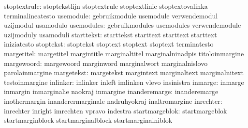                     stoptextrule: stoptekstlijn                    stoptextrule
                                  stoptextlinie                    stoptextovalinka
                                  terminalineatesto
                       usemodule: gebruikmodule                    usemodule
                                  verwendemodul                    uzijmodul
                                  usamodulo
                      usemodules: gebruikmodules                   usemodules
                                  verwendemodule                   uzijmoduly
                                  usamoduli
                      starttekst: starttekst                       starttext
                                  starttext                        starttext
                                  iniziatesto
                       stoptekst: stoptekst                        stoptext
                                  stoptext                         stoptext
                                  terminatesto
                      margetitel: margetitel                       margintitle
                                  marginaltitel                    marginalninadpis
                                  titoloinmargine
                      margewoord: margewoord                       marginword
                                  marginalwort                     marginalnislovo
                                  parolainmargine
                      margetekst: margetekst                       margintext
                                  marginaltext                     marginalnitext
                                  testoinmargine
                        inlinker: inlinker                         inleft
                                  imlinken                         vlevo
                                  insinistra
                         inmarge: inmarge                          inmargin
                                  inmarginalie                     naokraj
                                  inmargine
                   inanderemarge: inanderemarge                    inothermargin
                                  inanderermarginale               nadruhyokraj
                                  inaltromargine
                       inrechter: inrechter                        inright
                                  imrechten                        vpravo
                                  indestra
                  startmargeblok: startmargeblok                   startmarginblock
                                  startmarginalblock               startmarginalniblok
